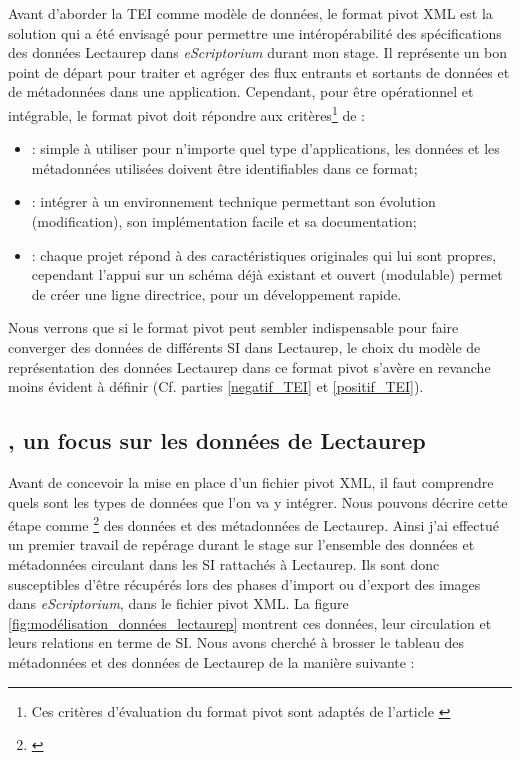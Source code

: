 Avant d'aborder la TEI comme modèle de données, le format pivot XML est la solution qui a été envisagé pour permettre une intéropérabilité des spécifications des données Lectaurep dans \textit{eScriptorium} durant mon stage. Il représente un bon point de départ pour traiter et agréger des flux entrants et sortants de données et de métadonnées dans une application. Cependant, pour être opérationnel et intégrable, le format pivot doit répondre aux critères\footnote{Ces critères d'évaluation du format pivot sont adaptés de l'article \cite{crozat_standardisation_2006}} de : 
\begin{itemize}
    \item {} : simple à utiliser pour n'importe quel type d'applications, les données et les métadonnées utilisées doivent être identifiables dans ce format;
    \item {} : intégrer à un environnement technique permettant son évolution (modification), son implémentation facile et sa documentation;
    \item {} : chaque projet répond à des caractéristiques originales qui lui sont propres, cependant l'appui sur un schéma déjà existant et ouvert (modulable) permet de créer une ligne directrice, pour un développement rapide.
\end{itemize}
Nous verrons que si le format pivot peut sembler indispensable pour faire converger des données de différents SI dans Lectaurep, le choix du modèle de représentation des données Lectaurep dans ce format pivot s'avère en revanche moins évident à définir (Cf. parties \ref{negatif_TEI} et \ref{positif_TEI}). 


\subsection{, un focus sur les données de Lectaurep}\label{Circonscrire un monde de données}
Avant de concevoir la mise en place d'un fichier pivot XML, il faut comprendre quels sont les types de données que l'on va y intégrer. Nous pouvons décrire cette étape comme \footnote{\cite{poupeau_visite_2019}} des données et des métadonnées de Lectaurep. Ainsi j'ai effectué un premier travail de repérage durant le stage sur l'ensemble des données et métadonnées circulant dans les SI rattachés à Lectaurep. Ils sont donc susceptibles d'être récupérés lors des phases d'import ou d'export des images dans \textit{eScriptorium}, dans le fichier pivot XML.
La figure \ref{fig:modélisation_données_lectaurep} montrent ces données, leur circulation et leurs relations en terme de SI. Nous avons cherché à brosser le tableau des métadonnées et des données de Lectaurep de la manière suivante :\\

